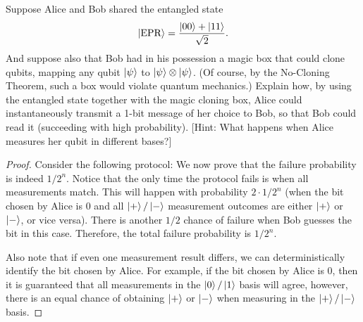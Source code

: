 \begin{solution}[label=ques:2a]
  \begin{question}
    Suppose Alice and Bob shared the entangled state
\[
  \ket{\text{EPR}} = \frac{\ket{00}+\ket{11}}{\sqrt{2}}.
\]
And suppose also that Bob had in his possession a magic box that could clone qubits, mapping any qubit $\ket{\psi}$ to $\ket{\psi}\otimes\ket{\psi}$.  (Of course, by the No-Cloning Theorem, such a box would violate quantum mechanics.)  Explain how, by using the entangled state together with the magic cloning box, Alice could instantaneously transmit a 1-bit message of her choice to Bob, so that Bob could read it (succeeding with high probability). [Hint: What happens when Alice measures her qubit in different bases?]
  \end{question}
  \tcblower{}
  \begin{proof}
    Consider the following protocol:
    We now prove that the failure probability is indeed $1/2^n$. Notice that the only time the protocol fails is when all measurements match. This will happen with probability $2\cdot 1/2^n$ (when the bit chosen by Alice is $0$ and all $\ket{+}/\ket{-}$ measurement outcomes are either $\ket{+}$ or $\ket{-}$, or vice versa). There is another $1/2$ chance of failure when Bob guesses the bit in this case. Therefore, the total failure probability is $1/2^n$.\par
    Also note that if even one measurement result differs, we can deterministically identify the bit chosen by Alice. For example, if the bit chosen by Alice is $0$, then it is guaranteed that all measurements in the $\ket{0}/\ket{1}$ basis will agree, however, there is an equal chance of obtaining $\ket{+}$ or $\ket{-}$ when measuring in the $\ket{+}/\ket{-}$ basis.
  \end{proof}
\end{solution}
